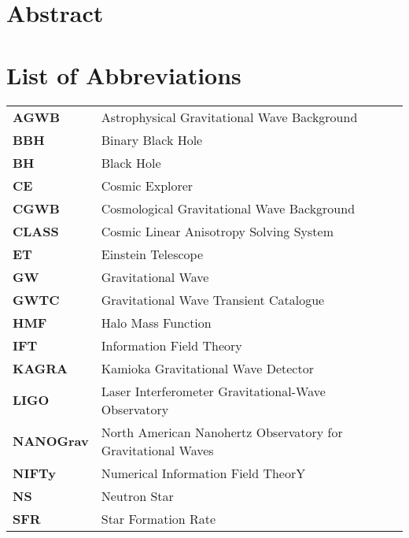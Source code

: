 \documentclass[twoside, 11pt, openany]{book}
\begin{document}
{}

\chapter*{Abstract}


\chapter*{List of Abbreviations}

\begin{table}[h]
        \begin{tabular}{l l}
            \textbf{AGWB} & Astrophysical Gravitational Wave Background
            \\
            \textbf{BBH} & Binary Black Hole
            \\
            \textbf{BH} & Black Hole
            \\
            \textbf{CE} & Cosmic Explorer
            \\
            \textbf{CGWB} & Cosmological Gravitational Wave Background
            \\
            \textbf{CLASS} & Cosmic Linear Anisotropy Solving System 
            \\
            \textbf{ET} & Einstein Telescope
            \\
            \textbf{GW} & Gravitational Wave
            \\
            \textbf{GWTC} & Gravitational Wave Transient Catalogue
            \\
            \textbf{HMF} & Halo Mass Function
            \\
            \textbf{IFT} & Information Field Theory
            \\
            \textbf{KAGRA} & Kamioka Gravitational Wave Detector
            \\
            \textbf{LIGO} & Laser Interferometer Gravitational-Wave Observatory
            \\
            \textbf{NANOGrav} & North American Nanohertz Observatory for Gravitational Waves
            \\
            \textbf{NIFTy} & Numerical Information Field TheorY
            \\
            \textbf{NS} & Neutron Star
            \\
            \textbf{SFR} & Star Formation Rate

        \end{tabular}
\end{table}
\end{document}
